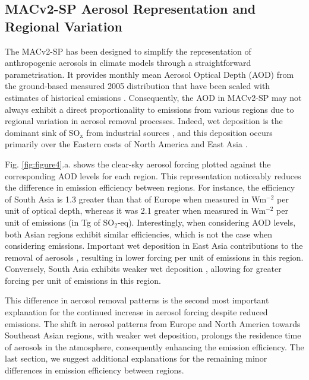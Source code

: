 \documentclass[draft]{agujournal2019}
\begin{document}
      \subsection{MACv2-SP Aerosol Representation and Regional Variation}
            The MACv2-SP has been designed to simplify the representation of anthropogenic aerosols in climate models through a straightforward parametrisation. 
            It provides monthly mean Aerosol Optical Depth (AOD) from the ground-based measured 2005 distribution that have been scaled with estimates of historical emissions \cite{Stevens_2017}. 
            Consequently, the AOD in MACv2-SP may not always exhibit a direct proportionality to emissions from various regions due to regional variation in aerosol removal processes. Indeed, wet deposition is the dominant sink of SO$_{\textrm{x}}$ from industrial sources \cite{Textor_2006}, and this deposition occurs primarily over the Eastern costs of North America and East Asia \cite{Rodhe_2002}.

            Fig. \ref{fig:figure4}.a. shows the clear-sky aerosol forcing plotted against the corresponding AOD levels for each region. This representation noticeably reduces the difference in emission efficiency between regions. For instance, the efficiency of South Asia is 1.3 greater than that of Europe when measured in Wm$^{-2}$ per unit of optical depth, whereas it was 2.1 greater when measured in Wm$^{-2}$ per unit of emissions (in Tg of SO$_2$-eq).
            Interestingly, when considering AOD levels, both Asian regions exhibit similar efficiencies, which is not the case when considering emissions. 
            Important wet deposition in East Asia contributions to the removal of aerosols \cite{Rodhe_2002}, resulting in lower forcing per unit of emissions in this region. Conversely, South Asia exhibits weaker wet deposition \cite{Rodhe_2002}, allowing for greater forcing per unit of emissions in this region.

            This difference in aerosol removal patterns is the second most important explanation for the continued increase in aerosol forcing despite reduced emissions. The shift in aerosol patterns from Europe and North America towards Southeast Asian regions, with weaker wet deposition, prolongs the residence time of aerosols in the atmosphere, consequently enhancing the emission efficiency.
            The last section, we suggest additional explanations for the remaining minor differences in emission efficiency between regions.
\end{document}
